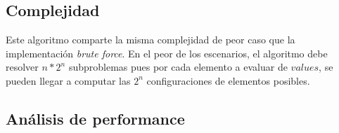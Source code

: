 \subsection{Complejidad}
Este algoritmo comparte la misma complejidad de peor caso que la implementación \textit{brute force}. En el peor de los escenarios, el algoritmo debe resolver $n*2^n$ subproblemas pues por cada elemento a evaluar de $values$, se pueden llegar a computar las $2^n$ configuraciones de elementos posibles.

\subsection{Análisis de performance}